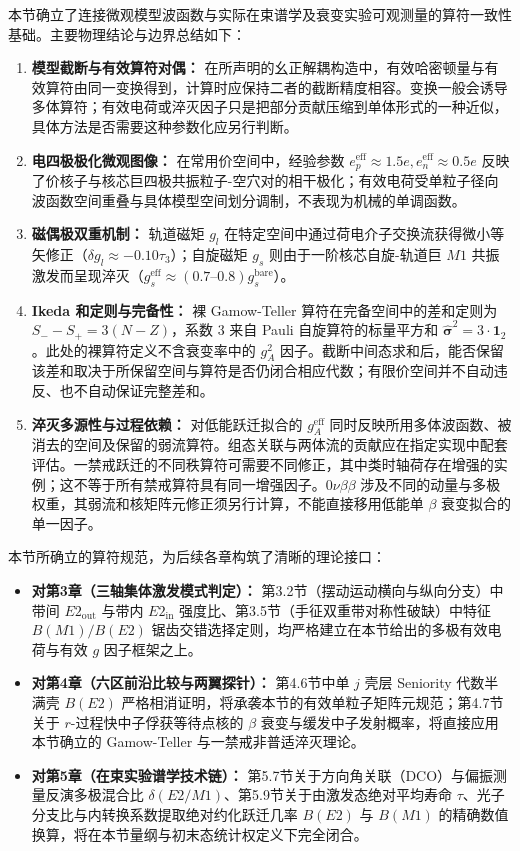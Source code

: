 本节确立了连接微观模型波函数与实际在束谱学及衰变实验可观测量的算符一致性基础。主要物理结论与边界总结如下：
\begin{enumerate}
\item \textbf{模型截断与有效算符对偶：} 在所声明的幺正解耦构造中，有效哈密顿量与有效算符由同一变换得到，计算时应保持二者的截断精度相容。变换一般会诱导多体算符；有效电荷或淬灭因子只是把部分贡献压缩到单体形式的一种近似，具体方法是否需要这种参数化应另行判断。
\item \textbf{电四极极化微观图像：} 在常用价空间中，经验参数 $e_p^{\mathrm{eff}} \approx 1.5e, e_n^{\mathrm{eff}} \approx 0.5e$ 反映了价核子与核芯巨四极共振粒子-空穴对的相干极化；有效电荷受单粒子径向波函数空间重叠与具体模型空间划分调制，不表现为机械的单调函数。
\item \textbf{磁偶极双重机制：} 轨道磁矩 $g_l$ 在特定空间中通过荷电介子交换流获得微小等矢修正（$\delta g_l \approx -0.10\tau_3$）；自旋磁矩 $g_s$ 则由于一阶核芯自旋-轨道巨 $M1$ 共振激发而呈现淬灭（$g_s^{\mathrm{eff}} \approx (0.7\text{--}0.8) g_s^{\mathrm{bare}}$）。
\item \textbf{Ikeda 和定则与完备性：} 裸 Gamow-Teller 算符在完备空间中的差和定则为 $S_- - S_+ = 3(N-Z)$，系数 3 来自 Pauli 自旋算符的标量平方和 $\hat{\boldsymbol{\sigma}}^2 = 3 \cdot \mathbf{1}_2$。此处的裸算符定义不含衰变率中的 $g_A^2$ 因子。截断中间态求和后，能否保留该差和取决于所保留空间与算符是否仍闭合相应代数；有限价空间并不自动违反、也不自动保证完整差和。
\item \textbf{淬灭多源性与过程依赖：} 对低能跃迁拟合的 $g_A^{\mathrm{eff}}$ 同时反映所用多体波函数、被消去的空间及保留的弱流算符。组态关联与两体流的贡献应在指定实现中配套评估。一禁戒跃迁的不同秩算符可需要不同修正，其中类时轴荷存在增强的实例；这不等于所有禁戒算符具有同一增强因子。$0\nu\beta\beta$ 涉及不同的动量与多极权重，其弱流和核矩阵元修正须另行计算，不能直接移用低能单 $\beta$ 衰变拟合的单一因子。
\end{enumerate}

本节所确立的算符规范，为后续各章构筑了清晰的理论接口：
\begin{itemize}
\item \textbf{对第3章（三轴集体激发模式判定）：} 第3.2节（摆动运动横向与纵向分支）中带间 $E2_{\mathrm{out}}$ 与带内 $E2_{\mathrm{in}}$ 强度比、第3.5节（手征双重带对称性破缺）中特征 $B(M1)/B(E2)$ 锯齿交错选择定则，均严格建立在本节给出的多极有效电荷与有效 $g$ 因子框架之上。
\item \textbf{对第4章（六区前沿比较与两翼探针）：} 第4.6节中单 $j$ 壳层 Seniority 代数半满壳 $B(E2)$ 严格相消证明，将承袭本节的有效单粒子矩阵元规范；第4.7节关于 $r$-过程快中子俘获等待点核的 $\beta$ 衰变与缓发中子发射概率，将直接应用本节确立的 Gamow-Teller 与一禁戒非普适淬灭理论。
\item \textbf{对第5章（在束实验谱学技术链）：} 第5.7节关于方向角关联（DCO）与偏振测量反演多极混合比 $\delta(E2/M1)$、第5.9节关于由激发态绝对平均寿命 $\tau$、光子分支比与内转换系数提取绝对约化跃迁几率 $B(E2)$ 与 $B(M1)$ 的精确数值换算，将在本节量纲与初末态统计权定义下完全闭合。
\end{itemize}
